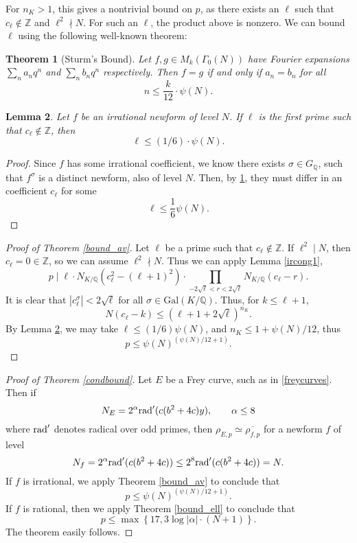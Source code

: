 \documentclass[12pt]{amsart}
\newtheorem{thm}{Theorem}[section]
\newtheorem{lem}[thm]{Lemma}
\theoremstyle{definition}
\def\Q{{\mathbb Q}}
\def\Z{{\mathbb Z}}
\newcommand{\rad}{{\rm{rad}}}
\renewcommand{\bar}{\overline}
\newcommand{\notdiv}{\nmid}
\newcommand{\Gal}{\text{Gal}}
\begin{document}
For $n_K > 1$, this gives a nontrivial bound on $p$, as there exists an $\ell$ such that $c_\ell \notin \mathbb{Z}$ and $\ell^2 \nmid N$. For such an $\ell$, the product above is nonzero. We can bound $\ell$ using the following well-known theorem:
\begin{thm}[Sturm's Bound]\label{sturm}
Let $f,g \in M_k(\Gamma_0(N))$ have Fourier expansions $\sum_n a_nq^n$ and $\sum_n b_n q^n$ respectively.  Then $f = g$ if and only if $a_n = b_n$ for all
\[ n \leq \frac{k}{12} \cdot \psi(N). \]
\end{thm}

\begin{lem}\label{boundell}
Let $f$ be an irrational newform of level $N$.  If $\ell$ is the first prime such that $c_\ell \not\in \Z$, then
\[ \ell \leq (1/6) \cdot \psi(N) .\]
\end{lem}

\begin{proof}
Since $f$ has some irrational coefficient, we know there exists $\sigma \in G_\Q$, such that $f^{\sigma}$ is a distinct newform, also of level $N$.  Then, by \ref{sturm}, they must differ in an coefficient $c_\ell$ for some 
\[ \ell \leq \frac{1}{6} \psi(N). \]
\end{proof}

\begin{proof}[Proof of Theorem \ref{bound_av}]
Let $\ell$ be a prime such that $c_\ell \notin \Z$.  If $\ell^2 \mid N$, then $c_\ell = 0 \in \Z$, so we can assume $\ell^2 \notdiv N$. Thus we can apply Lemma \ref{ircong1}, 
\[ p \mid \ell \cdot N_{K / \mathbb{Q}}(c_\ell^2-(\ell+1)^2) \cdot \prod_{-2\sqrt{\ell} < r < 2\sqrt{\ell}}{N_{K / \mathbb{Q}}}(c_\ell - r).\]
It is clear that $|c_\ell^{\sigma}| < 2\sqrt{\ell}$ for all $\sigma \in \Gal(K/\Q)$. Thus, for $k \leq \ell+1$, \[N(c_\ell - k) \leq (\ell+1 + 2\sqrt{\ell})^{n_{K}}.\] 
By Lemma \ref{boundell}, we may take $\ell \leq (1/6)\psi(N)$, and $n_{K} \leq 1+\psi(N)/12$, thus
\[ p \leq \psi(N)^{(\psi(N)/12+1)}. \]
\end{proof}
 
 
 \begin{proof}[Proof of Theorem \ref{condbound}]
 Let $E$ be a Frey curve, such as in \ref{freycurves}.  Then if
 \[N_E = 2^\alpha {\rad}'(c(b^2+4c)y), \qquad \alpha \leq 8\]
where ${\rad}'$ denotes radical over odd primes, then $\rho_{E,p} \simeq \bar{\rho_{f,p}}$ for a newform $f$ of level
\[N_f =  2^\alpha {\rad}'(c(b^2+4c))\leq 2^8  {\rad}'(c(b^2+4c)) = N.\]
 If $f$ is irrational, we apply Theorem \ref{bound_av} to conclude that
 \[ p \leq \psi(N)^{(\psi(N)/12+1)}. \]
 If $f$ is rational, then we apply Theorem \ref{bound_ell} to conclude that
 \[ p \leq \max\left\{ 17, 3 \log|\alpha| \cdot (N+1) \right\}. \]
 The theorem easily follows.
 \end{proof}
 
\end{document}
